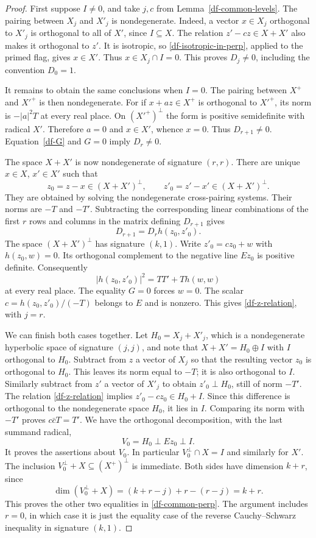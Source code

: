 \begin{proof}
First suppose $I\ne0$, and take $j,c$ from
Lemma~\ref{df-common-levels}.  The pairing between $X_j$ and $X'_j$
is nondegenerate.  Indeed, a vector $x\in X_j$ orthogonal to $X'_j$
is orthogonal to all of $X'$, since $I\subseteq X$.  The relation
$z'-cz\in X+X'$ also makes it orthogonal to $z'$.  It is isotropic,
so \eqref{df-isotropic-in-perp}, applied to the primed flag, gives
$x\in X'$.  Thus $x\in X_j\cap I=0$.  This proves $D_j\ne0$,
including the convention $D_0=1$.

It remains to obtain the same conclusions when $I=0$.
The pairing between $X^+$ and $X'^+$ is then nondegenerate.
For if $x+az\in X^+$ is orthogonal to $X'^+$, its norm is
$-|a|^2T$ at every real place.  On $(X'^+)^\perp$ the form is
positive semidefinite with radical $X'$.  Therefore $a=0$ and
$x\in X'$, whence $x=0$.  Thus $D_{r+1}\ne0$.
Equation~\eqref{df-G} and $G=0$ imply $D_r\ne0$.

The space $X+X'$ is now nondegenerate of signature $(r,r)$.
There are unique $x\in X$, $x'\in X'$ such that
\[
 z_0=z-x\in(X+X')^\perp,\qquad
 z'_0=z'-x'\in(X+X')^\perp.
\]
They are obtained by solving the nondegenerate cross-pairing
systems.  Their norms are $-T$ and $-T'$.  Subtracting the
corresponding linear combinations of the first $r$ rows and columns
in the matrix defining $D_{r+1}$ gives
\[
 D_{r+1}=D_r h(z_0,z'_0).
\]
The space $(X+X')^\perp$ has signature $(k,1)$.  Write
$z'_0=cz_0+w$ with $h(z_0,w)=0$.  Its orthogonal complement to the
negative line $Ez_0$ is positive definite.  Consequently
\[
 |h(z_0,z'_0)|^2=TT'+T h(w,w)
\]
at every real place.  The equality $G=0$ forces $w=0$.
The scalar $c=h(z_0,z'_0)/(-T)$ belongs to $E$ and is nonzero.
This gives \eqref{df-z-relation}, with $j=r$.

We can finish both cases together.  Let
$H_0=X_j+X'_j$, which is a nondegenerate hyperbolic space of
signature $(j,j)$, and note that
$X+X'=H_0\oplus I$ with $I$ orthogonal to $H_0$.
Subtract from $z$ a vector of $X_j$ so that the resulting vector
$z_0$ is orthogonal to $H_0$.  This leaves its norm equal to $-T$;
it is also orthogonal to $I$.  Similarly subtract from $z'$ a
vector of $X'_j$ to obtain $z'_0\perp H_0$, still of norm $-T'$.
The relation \eqref{df-z-relation} implies
$z'_0-cz_0\in H_0+I$.  Since this difference is orthogonal to the
nondegenerate space $H_0$, it lies in $I$.
Comparing its norm with $-T'$ proves $c\bar c T=T'$.
We have the orthogonal decomposition, with the last summand radical,
\[
 V_0=H_0\mathbin{\perp}Ez_0\mathbin{\perp}I.
\]
It proves the assertions about $V_0$.  In particular
$V_0^\perp\cap X=I$ and similarly for $X'$.
The inclusion $V_0^\perp+X\subseteq(X^+)^\perp$ is immediate.
Both sides have dimension $k+r$, since
\[
 \dim(V_0^\perp+X)
 =(k+r-j)+r-(r-j)=k+r.
\]
This proves the other two equalities in \eqref{df-common-perp}.
The argument includes $r=0$, in which case it is just the equality
case of the reverse Cauchy--Schwarz inequality in signature $(k,1)$.
\end{proof}

